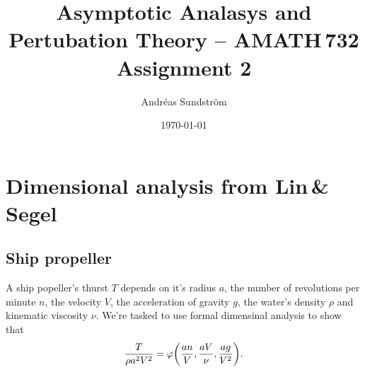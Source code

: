 \documentclass[11pt,letter, swedish, english
]{article}
\begin{document}
\title{Asymptotic Analasys and Pertubation Theory -- AMATH\,732 \\
Assignment 2}
\author{Andréas Sundström}
\date{\today}

\maketitle



\section{Dimensional analysis from Lin\,\&\,Segel}
\setcounter{subsection}{4}
\renewcommand{\thesubsection}{L\&S 6.2: \arabic{subsection}}
\subsection{Ship propeller}
A ship popeller's thurst $T$ depends on it's radius $a$, the number of
revolutions per minute $n$, the velocity $V$, the acceleration of
gravity $g$, the water's density $\rho$ and kinematic viscosity $\nu$.
We're tasked to use formal dimensinal analysis to show that
\begin{equation}
\frac{T}{\rho a^2 V^2} = 
\varphi\qty(\frac{an}{V}, \frac{aV}{\nu}, \frac{ag}{V^2}).
\end{equation}
\end{document}

